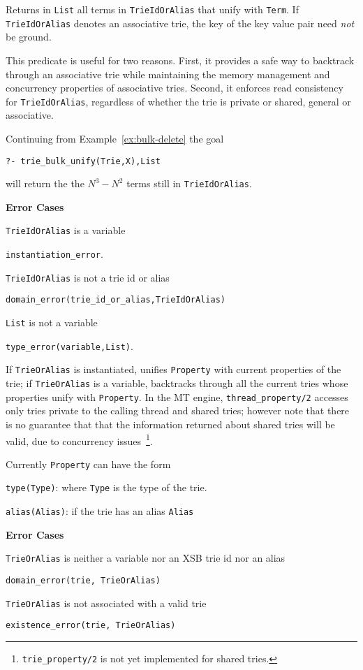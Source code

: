 \begin{description}
% 
Returns in {\tt List} all terms in {\tt TrieIdOrAlias} that unify with
{\tt Term}.  If {\tt TrieIdOrAlias} denotes an associative trie, the
key of the key value pair need {\em not} be ground.

This predicate is useful for two reasons.  First, it provides a safe
way to backtrack through an associative trie while maintaining the
memory management and concurrency properties of associative tries.
Second, it enforces read consistency for {\tt TrieIdOrAlias},
regardless of whether the trie is private or shared, general or
associative.

\begin{example} \rm
Continuing from Example~\ref{ex:bulk-delete} the goal
\begin{center}
{\tt ?-  trie\_bulk\_unify(Trie,X),List} 
\end{center}
will return the the $N^3 - N^2$ terms still in {\tt TrieIdOrAlias}.
\end{example}

{\bf Error Cases}
\bi
\item 	{\tt TrieIdOrAlias} is a variable
\bi
\item 	{\tt instantiation\_error}.
\ei
\item 	{\tt TrieIdOrAlias} is not a trie id or alias
\bi
\item 	{\tt domain\_error(trie\_id\_or\_alias,TrieIdOrAlias)}
\ei
\item 	{\tt List} is not a variable
\bi
\item 	{\tt type\_error(variable,List)}.
\ei
\ei

%
If {\tt TrieOrAlias} is instantiated, unifies {\tt Property} with
current properties of the trie; if {\tt TrieOrAlias} is a variable,
backtracks through all the current tries whose properties unify with
{\tt Property}.  In the MT engine, {\tt thread\_property/2} accesses
only tries private to the calling thread and shared tries; however
note that there is no guarantee that that the information returned
about shared tries will be valid, due to concurrency
issues~\footnote{{\tt trie\_property/2} is not yet implemented for
  shared tries.}.

Currently {\tt Property} can have the form 
\bi
\item {\tt type(Type)}: where {\tt Type} is the type of the trie.
%
\item {\tt alias(Alias)}: if the trie has an alias {\tt Alias}
\ei

{\bf Error Cases}
%
\bi
\item {\tt TrieOrAlias} is neither a variable nor an XSB trie id
  nor an alias
\bi
\item {\tt domain\_error(trie, TrieOrAlias)}
\ei
\item {\tt TrieOrAlias} is not associated with a valid trie
\bi
\item {\tt existence\_error(trie, TrieOrAlias)}
\ei
\ei

%
\end{description}

